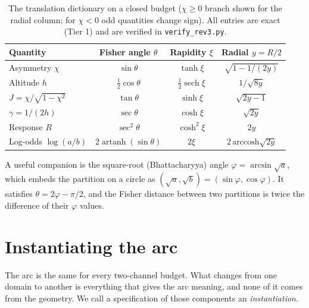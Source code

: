 \documentclass[11pt]{article}
\theoremstyle{definition}
\theoremstyle{remark}
\newcommand{\artanh}{\operatorname{artanh}}
\newcommand{\sech}{\operatorname{sech}}
\begin{document}
\begin{table}[ht]
\centering\small
\caption{The translation dictionary on a closed budget ($\chi\ge0$ branch shown for the
radial column; for $\chi<0$ odd quantities change sign). All entries are exact (Tier 1) and
are verified in \texttt{verify\_rev3.py}.}
\label{tab:dictionary}
\begin{tabular}{@{}lccc@{}}
\toprule
Quantity & Fisher angle $\theta$ & Rapidity $\xi$ & Radial $y=R/2$\\
\midrule
Asymmetry $\chi$ & $\sin\theta$ & $\tanh\xi$ & $\sqrt{1-1/(2y)}$\\
Altitude $h$ & $\tfrac12\cos\theta$ & $\tfrac12\sech\xi$ & $1/\sqrt{8y}$\\
$J=\chi/\sqrt{1-\chi^2}$ & $\tan\theta$ & $\sinh\xi$ & $\sqrt{2y-1}$\\
$\gamma=1/(2h)$ & $\sec\theta$ & $\cosh\xi$ & $\sqrt{2y}$\\
Response $R$ & $\sec^2\theta$ & $\cosh^2\xi$ & $2y$\\
Log-odds $\log(a/b)$ & $2\artanh(\sin\theta)$ & $2\xi$ & $2\,\mathrm{arccosh}\sqrt{2y}$\\
\bottomrule
\end{tabular}
\end{table}

A useful companion is the square-root (Bhattacharyya) angle $\varphi=\arcsin\sqrt a$, which
embeds the partition on a circle as $(\sqrt a,\sqrt b)=(\sin\varphi,\cos\varphi)$. It
satisfies $\theta=2\varphi-\pi/2$, and the Fisher distance between two partitions is twice
the difference of their $\varphi$ values.

\section{Instantiating the arc}\label{sec:instantiation}

The arc is the same for every two-channel budget. What changes from one domain to another is
everything that gives the arc meaning, and none of it comes from the geometry. We call a
specification of those components an \emph{instantiation}.
\end{document}
